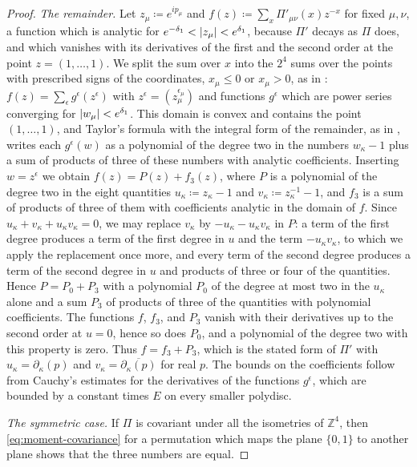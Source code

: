 \documentclass[11pt]{preprint}
\DeclarePairedDelimiter{\abs}{\lvert}{\rvert}
\numberwithin{equation}{section}
\theoremstyle{definition}
\theoremstyle{remark}
\theoremstyle{plain}
\begin{document}
\begin{proof}
\emph{The remainder.} Let $z_\mu \coloneqq e^{ip_\mu}$ and $f(z) \coloneqq \sum_x\Pi'_{\mu\nu}(x)z^{-x}$ for fixed $\mu, \nu$, a function which is analytic for $e^{-\delta_1} < \abs{z_\mu} < e^{\delta_1}$, because $\Pi'$ decays as $\Pi$ does, and which vanishes with its derivatives of the first and the second order at the point $z = (1, \dots, 1)$. We split the sum over $x$ into the $2^4$ sums over the points with prescribed signs of the coordinates, $x_\mu \leq 0$ or $x_\mu > 0$, as in \cite[(5.22)]{BalabanRG1}: $f(z) = \sum_\epsilon g^\epsilon(z^\epsilon)$ with $z^\epsilon = (z_\mu^{\epsilon_\mu})$ and functions $g^\epsilon$ which are power series converging for $\abs{w_\mu} < e^{\delta_1}$. This domain is convex and contains the point $(1, \dots, 1)$, and Taylor's formula with the integral form of the remainder, as in \cite[(5.30)]{BalabanRG1}, writes each $g^\epsilon(w)$ as a polynomial of the degree two in the numbers $w_\kappa - 1$ plus a sum of products of three of these numbers with analytic coefficients. Inserting $w = z^\epsilon$ we obtain $f(z) = P(z) + f_3(z)$, where $P$ is a polynomial of the degree two in the eight quantities $u_\kappa \coloneqq z_\kappa - 1$ and $v_\kappa \coloneqq z_\kappa^{-1} - 1$, and $f_3$ is a sum of products of three of them with coefficients analytic in the domain of $f$. Since $u_\kappa + v_\kappa + u_\kappa v_\kappa = 0$, we may replace $v_\kappa$ by $-u_\kappa - u_\kappa v_\kappa$ in $P$: a term of the first degree produces a term of the first degree in $u$ and the term $-u_\kappa v_\kappa$, to which we apply the replacement once more, and every term of the second degree produces a term of the second degree in $u$ and products of three or four of the quantities. Hence $P = P_0 + P_3$ with a polynomial $P_0$ of the degree at most two in the $u_\kappa$ alone and a sum $P_3$ of products of three of the quantities with polynomial coefficients. The functions $f$, $f_3$, and $P_3$ vanish with their derivatives up to the second order at $u = 0$, hence so does $P_0$, and a polynomial of the degree two with this property is zero. Thus $f = f_3 + P_3$, which is the stated form of $\Pi'$ with $u_\kappa = \partial_\kappa(p)$ and $v_\kappa = \overline{\partial_\kappa(p)}$ for real $p$. The bounds on the coefficients follow from Cauchy's estimates for the derivatives of the functions $g^\epsilon$, which are bounded by a constant times $E$ on every smaller polydisc.

\emph{The symmetric case.} If $\Pi$ is covariant under all the isometries of $\mathbb Z^4$, then \eqref{eq:moment-covariance} for a permutation which maps the plane $\{ 0, 1 \}$ to another plane shows that the three numbers are equal.
\end{proof}
\end{document}
